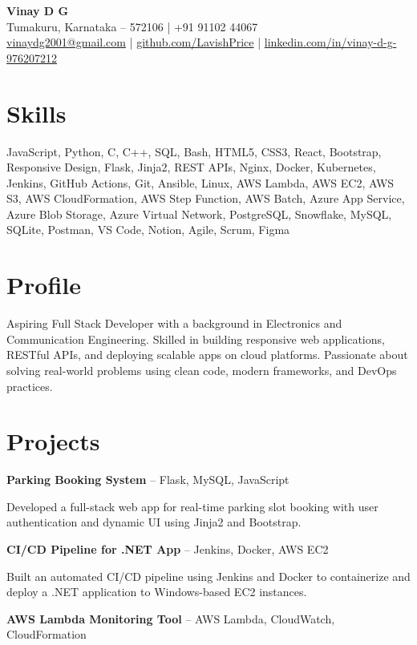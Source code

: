 \documentclass[a4paper,10pt]{article}
\begin{document}
\begin{center}
    \textbf{\Large Vinay D G} \\
    Tumakuru, Karnataka – 572106 \quad | \quad +91 91102 44067 \\
    \href{mailto:vinaydg2001@gmail.com}{vinaydg2001@gmail.com} \quad | \quad
    \href{https://github.com/LavishPrince}{github.com/LavishPrice} \quad | \quad
    \href{https://www.linkedin.com/in/vinay-d-g-976207212/}{linkedin.com/in/vinay-d-g-976207212}
\end{center}

\section*{Skills}
JavaScript, Python, C, C++, SQL, Bash, HTML5, CSS3, React, Bootstrap, Responsive Design, Flask, Jinja2, REST APIs, Nginx, Docker, Kubernetes, Jenkins, GitHub Actions, Git, Ansible, Linux, AWS Lambda, AWS EC2, AWS S3, AWS CloudFormation, AWS Step Function, AWS Batch, Azure App Service, Azure Blob Storage, Azure Virtual Network, PostgreSQL, Snowflake, MySQL, SQLite, Postman, VS Code, Notion, Agile, Scrum, Figma

\section*{Profile}
Aspiring Full Stack Developer with a background in Electronics and Communication Engineering. Skilled in building responsive web applications, RESTful APIs, and deploying scalable apps on cloud platforms. Passionate about solving real-world problems using clean code, modern frameworks, and DevOps practices.

\section*{Projects}
\textbf{Parking Booking System} – Flask, MySQL, JavaScript

Developed a full-stack web app for real-time parking slot booking with user authentication and dynamic UI using Jinja2 and Bootstrap.

\textbf{CI/CD Pipeline for .NET App} – Jenkins, Docker, AWS EC2

Built an automated CI/CD pipeline using Jenkins and Docker to containerize and deploy a .NET application to Windows-based EC2 instances.

\textbf{AWS Lambda Monitoring Tool} – AWS Lambda, CloudWatch, CloudFormation
\end{document}
